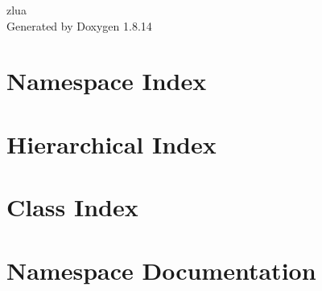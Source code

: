 \documentclass[twoside]{book}
\newcommand{\+}{\discretionary{\mbox{\scriptsize$\hookleftarrow$}}{}{}}
\newcommand{\clearemptydoublepage}{%
  \newpage{\pagestyle{empty}\cleardoublepage}%
}
\begin{document}
\hypersetup{pageanchor=false,
             bookmarksnumbered=true,
             pdfencoding=unicode
            }
\begin{titlepage}
\vspace*{7cm}
\begin{center}%
{\Large zlua }\\
\vspace*{1cm}
{\large Generated by Doxygen 1.8.14}\\
\end{center}
\end{titlepage}
\clearemptydoublepage
{}
\tableofcontents
\clearemptydoublepage
{}
\hypersetup{pageanchor=true}

\chapter{Namespace Index}

\chapter{Hierarchical Index}

\chapter{Class Index}

\chapter{Namespace Documentation}

\end{document}
